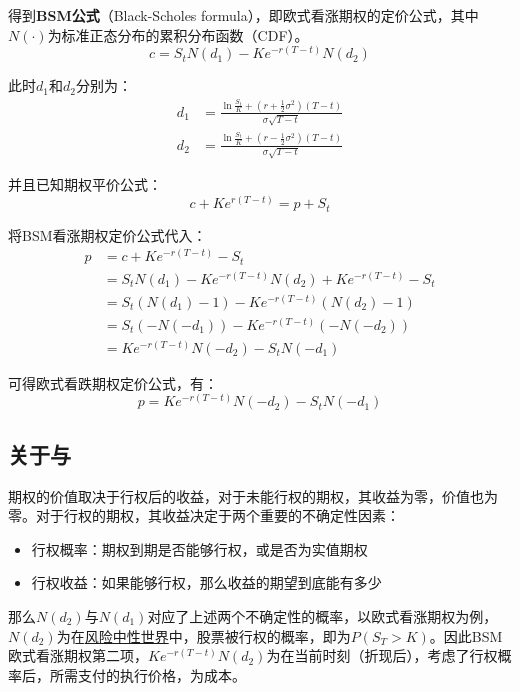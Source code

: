 \documentclass[11pt]{article}
\begin{document}
得到\textbf{BSM公式}（Black-Scholes formula），即欧式看涨期权的定价公式，其中$N(\cdot)$为标准正态分布的累积分布函数（CDF）。
\begin{equation*}
    \boxed{
        c = S_t N(d_1) - Ke^{-r(T-t)} N(d_2)
    }
\end{equation*}

此时$d_1$和$d_2$分别为：
\begin{align*}
    d_1 &= \frac{\ln \frac{S_t}{K} + (r+\frac{1}{2}\sigma^2)(T-t)}{\sigma\sqrt{T-t}} \\
    d_2 &= \frac{\ln \frac{S_t}{K} + (r-\frac{1}{2}\sigma^2)(T-t)}{\sigma\sqrt{T-t}}
\end{align*}

并且已知期权平价公式：
\begin{equation*}
    c + K e^{r(T-t)} = p + S_t
\end{equation*}

将BSM看涨期权定价公式代入：
\begin{align*}
    p & = c + K e^{-r(T-t)} - S_t \\
    & = S_t N(d_1) - Ke^{-r(T-t)} N(d_2) +  Ke^{-r(T-t)} - S_t \\
    & = S_t (N(d_1) - 1) - K e^{-r(T-t)}(N(d_2)-1) \\
    & = S_t (-N(-d_1)) - K e^{-r(T-t)}(-N(-d_2)) \\
    & = K e^{-r(T-t)}N(-d_2) - S_t N(-d_1)
\end{align*}

可得欧式看跌期权定价公式，有：
\begin{equation*}
    \boxed{
    p = K e^{-r(T-t)}N(-d_2) - S_t N(-d_1)
    }
\end{equation*}

\subsection{关于与}

期权的价值取决于行权后的收益，对于未能行权的期权，其收益为零，价值也为零。对于行权的期权，其收益决定于两个重要的不确定性因素：
\begin{itemize}
    \item 行权概率：期权到期是否能够行权，或是否为实值期权
    \item 行权收益：如果能够行权，那么收益的期望到底能有多少
\end{itemize}

那么$N(d_2)$与$N(d_1)$对应了上述两个不确定性的概率，以欧式看涨期权为例，$N(d_2)$为在\uline{风险中性世界}中，股票被行权的概率，即为$P(S_T>K)$。因此BSM欧式看涨期权第二项，$Ke^{-r(T-t)}N(d_2)$为在当前时刻（折现后），考虑了行权概率后，所需支付的执行价格，为成本。
\end{document}
